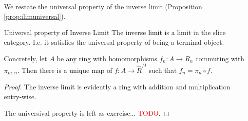 \section{}

We restate the universal property of the inverse limit (Proposition \ref{prop:ilimuniversal}).
\begin{aproposition*}{Universal property of Inverse Limit}{}
    The inverse limit is a limit in the slice category. I.e. it satisfies the universal property of being a terminal object.

    Concretely, let $A$ be any ring with homomorphisms $f_n:A\to R_n$ commuting with $\pi_{m,n}$. Then there is a unique map of $f:A\to \hat{R}^{/I}$ such that $f_n=\pi_n\circ f$.
\end{aproposition*}
\begin{proof}
    The inverse limit is evidently a ring with addition and multiplication entry-wise.

    The universival property is left as exercise... \textcolor{red}{TODO}.
\end{proof}

